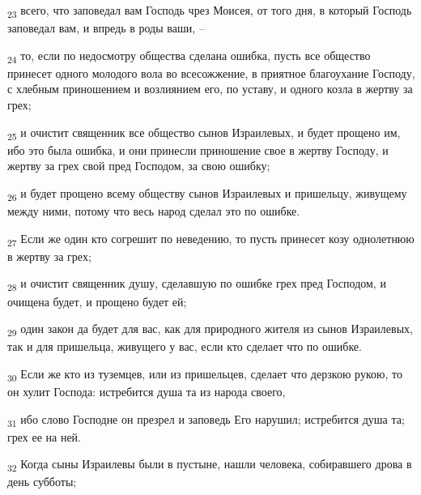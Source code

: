 \begin{tcolorbox}
\textsubscript{23} всего, что заповедал вам Господь чрез Моисея, от того дня, в который Господь заповедал вам, и впредь в роды ваши, --
\end{tcolorbox}
\begin{tcolorbox}
\textsubscript{24} то, если по недосмотру общества сделана ошибка, пусть все общество принесет одного молодого вола во всесожжение, в приятное благоухание Господу, с хлебным приношением и возлиянием его, по уставу, и одного козла в жертву за грех;
\end{tcolorbox}
\begin{tcolorbox}
\textsubscript{25} и очистит священник все общество сынов Израилевых, и будет прощено им, ибо это была ошибка, и они принесли приношение свое в жертву Господу, и жертву за грех свой пред Господом, за свою ошибку;
\end{tcolorbox}
\begin{tcolorbox}
\textsubscript{26} и будет прощено всему обществу сынов Израилевых и пришельцу, живущему между ними, потому что весь народ сделал это по ошибке.
\end{tcolorbox}
\begin{tcolorbox}
\textsubscript{27} Если же один кто согрешит по неведению, то пусть принесет козу однолетнюю в жертву за грех;
\end{tcolorbox}
\begin{tcolorbox}
\textsubscript{28} и очистит священник душу, сделавшую по ошибке грех пред Господом, и очищена будет, и прощено будет ей;
\end{tcolorbox}
\begin{tcolorbox}
\textsubscript{29} один закон да будет для вас, как для природного жителя из сынов Израилевых, так и для пришельца, живущего у вас, если кто сделает что по ошибке.
\end{tcolorbox}
\begin{tcolorbox}
\textsubscript{30} Если же кто из туземцев, или из пришельцев, сделает что дерзкою рукою, то он хулит Господа: истребится душа та из народа своего,
\end{tcolorbox}
\begin{tcolorbox}
\textsubscript{31} ибо слово Господне он презрел и заповедь Его нарушил; истребится душа та; грех ее на ней.
\end{tcolorbox}
\begin{tcolorbox}
\textsubscript{32} Когда сыны Израилевы были в пустыне, нашли человека, собиравшего дрова в день субботы;
\end{tcolorbox}
